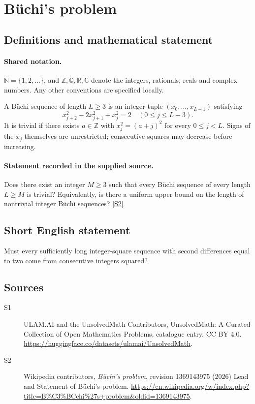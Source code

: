 \documentclass[11pt]{article}
\newcommand{\sref}[2]{\hyperlink{source:#1:#2}{[S#2]}}
\begin{document}
\section{Büchi's problem}\label{statement}

\subsection{Definitions and mathematical statement}

\paragraph{Shared notation.}$\mathbb N=\{1,2,\ldots\}$, and $\mathbb Z,\mathbb Q,\mathbb R,\mathbb C$ denote the integers, rationals, reals and complex numbers. Any other conventions are specified locally.


A B\"uchi sequence of length $L\ge3$ is an integer tuple $(x_0,\ldots,x_{L-1})$ satisfying
\[
x_{j+2}^2-2x_{j+1}^2+x_j^2=2\quad(0\le j\le L-3).
\]
It is trivial if there exists $a\in\mathbb Z$ with $x_j^2=(a+j)^2$ for every $0\le j<L$. Signs of the $x_j$ themselves are unrestricted; consecutive squares may decrease before increasing.
\paragraph{Statement recorded in the supplied source.}
Does there exist an integer $M\ge3$ such that every B\"uchi sequence of every length $L\ge M$ is trivial? Equivalently, is there a uniform upper bound on the length of nontrivial integer B\"uchi sequences? \sref{statement}{2}
\subsection{Short English statement}
Must every sufficiently long integer-square sequence with second differences equal to two come from consecutive integers squared?
\subsection{Sources}
\begin{description}
\item[\hypertarget{source:statement:1}{S1}] ULAM.AI and the UnsolvedMath Contributors, UnsolvedMath: A Curated Collection of Open Mathematics Problems, catalogue entry. CC BY 4.0. \url{https://huggingface.co/datasets/ulamai/UnsolvedMath}.
\item[\hypertarget{source:statement:2}{S2}] Wikipedia contributors, \emph{Büchi's problem}, revision 1369143975 (2026) Lead and Statement of Büchi’s problem. \url{https://en.wikipedia.org/w/index.php?title=B%C3%BCchi%27s+problem&oldid=1369143975}.
\end{description}
\label{end:statement}
\end{document}
